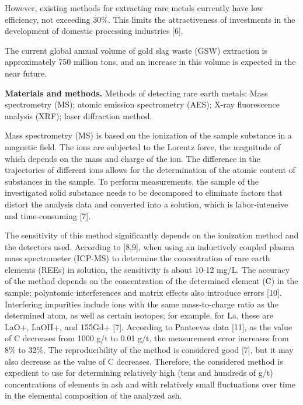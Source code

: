 \begin{multicols}{2}
However, existing methods for extracting rare metals currently have low
efficiency, not exceeding 30\%. This limits the attractiveness of
investments in the development of domestic processing industries
{[}6{]}.

The current global annual volume of gold slag waste (GSW) extraction is
approximately 750 million tons, and an increase in this volume is
expected in the near future.

{\bfseries Materials and methods.} Methods of detecting rare earth metals:
Mass spectrometry (MS); atomic emission spectrometry (AES); X-ray
fluorescence analysis (XRF); laser diffraction method.

Mass spectrometry (MS) is based on the ionization of the sample
substance in a magnetic field. The ions are subjected to the Lorentz
force, the magnitude of which depends on the mass and charge of the ion.
The difference in the trajectories of different ions allows for the
determination of the atomic content of substances in the sample. To
perform measurements, the sample of the investigated solid substance
needs to be decomposed to eliminate factors that distort the analysis
data and converted into a solution, which is labor-intensive and
time-consuming {[}7{]}.

The sensitivity of this method significantly depends on the ionization
method and the detectors used. According to {[}8,9{]}, when using an
inductively coupled plasma mass spectrometer (ICP-MS) to determine the
concentration of rare earth elements (REEs) in solution, the sensitivity
is about 10-12 mg/L. The accuracy of the method depends on the
concentration of the determined element (C) in the sample; polyatomic
interferences and matrix effects also introduce errors {[}10{]}.
Interfering impurities include ions with the same mass-to-charge ratio
as the determined atom, as well as certain isotopes; for example, for
La, these are LaO+, LaOH+, and 155Gd+ {[}7{]}. According to
Panteeva\textquotesingle s data {[}11{]}, as the value of C decreases
from 1000 g/t to 0.01 g/t, the measurement error increases from 8\% to
32\%. The reproducibility of the method is considered good {[}7{]}, but
it may also decrease as the value of C decreases. Therefore, the
considered method is expedient to use for determining relatively high
(tens and hundreds of g/t) concentrations of elements in ash and with
relatively small fluctuations over time in the elemental composition of
the analyzed ash.
\end{multicols}

